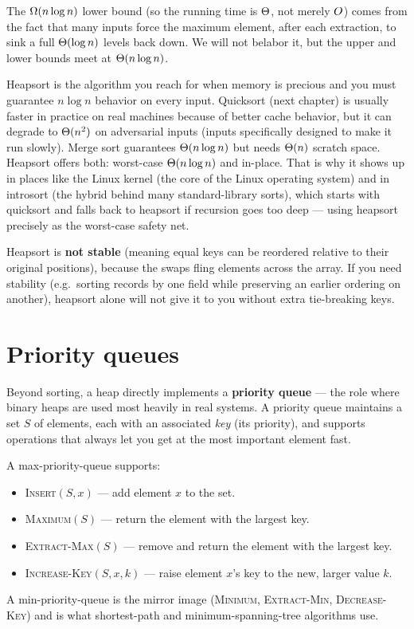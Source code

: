 The $\Omega(n\log n)$ lower bound (so the running time is $\Theta$, not merely $O$)
comes from the fact that many inputs force the maximum element, after each
extraction, to sink a full $\Theta(\log n)$ levels back down. We will not belabor
it, but the upper and lower bounds meet at $\Theta(n\log n)$.

\begin{aestheticbox}
Heapsort is the algorithm you reach for when memory is precious and you must
guarantee $n\log n$ behavior on every input. Quicksort (next chapter) is
usually faster in practice on real machines because of better cache behavior, but
it can degrade to $\Theta(n^2)$ on adversarial inputs (inputs specifically designed to make it run slowly). Merge sort guarantees
$\Theta(n\log n)$ but needs $\Theta(n)$ scratch space. Heapsort offers both:
worst-case $\Theta(n\log n)$ and in-place. That is why it shows up in places
like the Linux kernel (the core of the Linux operating system) and in introsort (the hybrid behind many standard-library
sorts), which starts with quicksort and falls back to heapsort if recursion goes
too deep --- using heapsort precisely as the worst-case safety net.
\end{aestheticbox}

\begin{trapbox}
Heapsort is \textbf{not stable} (meaning equal keys can be reordered relative to their
original positions), because the swaps fling elements across the array. If you
need stability (e.g.\ sorting records by one field while preserving an earlier
ordering on another), heapsort alone will not give it to you without extra
tie-breaking keys.
\end{trapbox}

\section{Priority queues}

Beyond sorting, a heap directly implements a \textbf{priority queue} --- the role
where binary heaps are used most heavily in real systems. A priority queue
maintains a set $S$ of elements, each with an associated \emph{key} (its
priority), and supports operations that always let you get at the most important
element fast.

\begin{focusbox}
A max-priority-queue supports:
\begin{itemize}
\item \textsc{Insert}$(S, x)$ --- add element $x$ to the set.
\item \textsc{Maximum}$(S)$ --- return the element with the largest key.
\item \textsc{Extract-Max}$(S)$ --- remove and return the element with the
largest key.
\item \textsc{Increase-Key}$(S, x, k)$ --- raise element $x$'s key to the new,
larger value $k$.
\end{itemize}
A min-priority-queue is the mirror image (\textsc{Minimum},
\textsc{Extract-Min}, \textsc{Decrease-Key}) and is what shortest-path and
minimum-spanning-tree algorithms use.
\end{focusbox}


